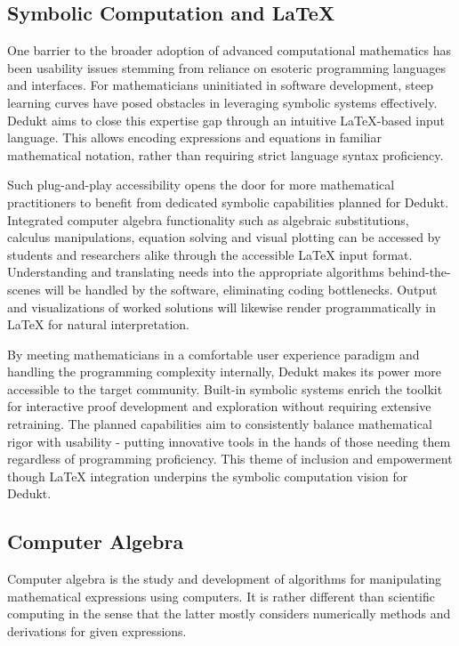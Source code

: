 \documentclass[9pt,a4paper,twocolumn]{article}
\begin{document}
        \subsection{Symbolic Computation and LaTeX}
        One barrier to the broader adoption of advanced computational mathematics has been usability issues stemming from reliance on esoteric programming languages and interfaces. For mathematicians uninitiated in software development, steep learning curves have posed obstacles in leveraging symbolic systems effectively. Dedukt aims to close this expertise gap through an intuitive LaTeX-based input language. This allows encoding expressions and equations in familiar mathematical notation, rather than requiring strict language syntax proficiency.

        Such plug-and-play accessibility opens the door for more mathematical practitioners to benefit from dedicated symbolic capabilities planned for Dedukt. Integrated computer algebra functionality such as algebraic substitutions, calculus manipulations, equation solving and visual plotting can be accessed by students and researchers alike through the accessible LaTeX input format. Understanding and translating needs into the appropriate algorithms behind-the-scenes will be handled by the software, eliminating coding bottlenecks. Output and visualizations of worked solutions will likewise render programmatically in LaTeX for natural interpretation.
        
        By meeting mathematicians in a comfortable user experience paradigm and handling the programming complexity internally, Dedukt makes its power more accessible to the target community. Built-in symbolic systems enrich the toolkit for interactive proof development and exploration without requiring extensive retraining. The planned capabilities aim to consistently balance mathematical rigor with usability - putting innovative tools in the hands of those needing them regardless of programming proficiency. This theme of inclusion and empowerment though LaTeX integration underpins the symbolic computation vision for Dedukt.
    
        \subsection{Computer Algebra}
            Computer algebra is the study and development of algorithms for manipulating mathematical expressions using computers. It is rather different than scientific computing in the sense that the latter mostly considers numerically methods and derivations for given expressions. 
            
\end{document}
